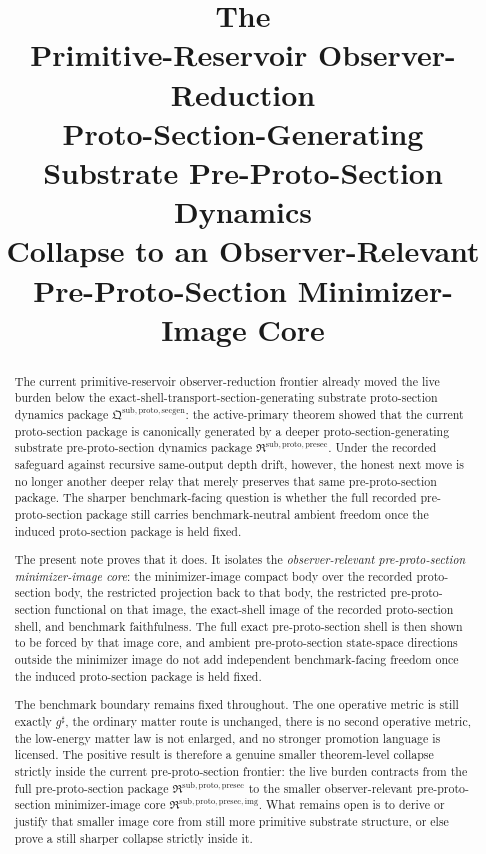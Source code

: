 \documentclass[11pt]{article}
\title{\textbf{The \TheoryName{}}\\[0.4em]
\large Primitive-Reservoir Observer-Reduction\\
\large Proto-Section-Generating Substrate Pre-Proto-Section Dynamics\\
\large Collapse to an Observer-Relevant\\
\large Pre-Proto-Section Minimizer-Image Core}
\author{}
\date{}
\newcommand{\CompletedMetric}{g^{\sharp}}
\newcommand{\ProtoSectionPackage}{\mathfrak Q^{\mathrm{sub,proto,secgen}}}
\newcommand{\PreProtoSectionPackage}{\mathfrak R^{\mathrm{sub,proto,presec}}}
\newcommand{\PreProtoSectionImageCore}{\mathfrak R^{\mathrm{sub,proto,presec,img}}}
\begin{document}
\maketitle

\begin{abstract}
The current primitive-reservoir observer-reduction frontier already moved the live burden below the exact-shell-transport-section-generating substrate proto-section dynamics package \(\ProtoSectionPackage\): the active-primary theorem showed that the current proto-section package is canonically generated by a deeper proto-section-generating substrate pre-proto-section dynamics package \(\PreProtoSectionPackage\). Under the recorded safeguard against recursive same-output depth drift, however, the honest next move is no longer another deeper relay that merely preserves that same pre-proto-section package. The sharper benchmark-facing question is whether the full recorded pre-proto-section package still carries benchmark-neutral ambient freedom once the induced proto-section package is held fixed.

The present note proves that it does. It isolates the \emph{observer-relevant pre-proto-section minimizer-image core}: the minimizer-image compact body over the recorded proto-section body, the restricted projection back to that body, the restricted pre-proto-section functional on that image, the exact-shell image of the recorded proto-section shell, and benchmark faithfulness. The full exact pre-proto-section shell is then shown to be forced by that image core, and ambient pre-proto-section state-space directions outside the minimizer image do not add independent benchmark-facing freedom once the induced proto-section package is held fixed.

The benchmark boundary remains fixed throughout. The one operative metric is still exactly \(\CompletedMetric\), the ordinary matter route is unchanged, there is no second operative metric, the low-energy matter law is not enlarged, and no stronger promotion language is licensed. The positive result is therefore a genuine smaller theorem-level collapse strictly inside the current pre-proto-section frontier: the live burden contracts from the full pre-proto-section package \(\PreProtoSectionPackage\) to the smaller observer-relevant pre-proto-section minimizer-image core \(\PreProtoSectionImageCore\). What remains open is to derive or justify that smaller image core from still more primitive substrate structure, or else prove a still sharper collapse strictly inside it.
\end{abstract}
\end{document}
